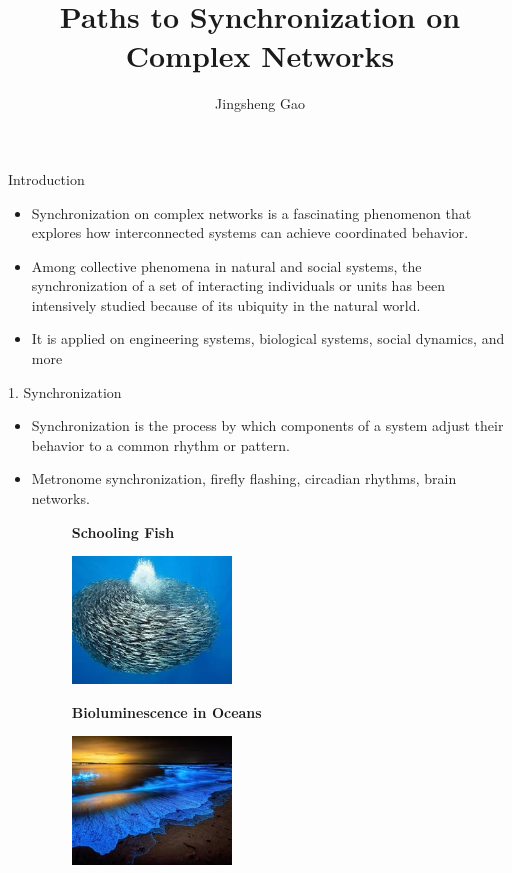 \documentclass[
  notheorems,
  aspectratio=54,
]{beamer}
\title{Paths to Synchronization on Complex Networks}
\author{Jingsheng Gao}
\institute{Anqing Normal University}
\begin{document}
\begin{frame}
    \titlepage
\end{frame}

\begin{frame}{Introduction}
 \begin{itemize}
    \item Synchronization on complex networks is a fascinating phenomenon that explores how interconnected systems can achieve coordinated behavior.
    \item Among collective phenomena in natural and social systems, the synchronization of a set of interacting individuals or units has been intensively studied because of its ubiquity in the natural world.
    \item It is applied on engineering systems, biological systems, social dynamics, and more
  \end{itemize}
\end{frame}

\begin{frame}{1. Synchronization}
  \begin{figure}
    \centering
  \end{figure}
  \begin{itemize}
    \item Synchronization is the process by which components of a system adjust their behavior to a common rhythm or pattern.
    \item Metronome synchronization, firefly flashing, circadian rhythms, brain networks.
\begin{figure}
  \begin{minipage}[b]{0.45\textwidth}
    \textbf{Schooling Fish}\par\medskip
    \includegraphics[width=0.4\textwidth]{schooling_fish.png}
  \end{minipage}
  \hfill
  \begin{minipage}[b]{0.45\textwidth}
    \textbf{Bioluminescence in Oceans}\par\medskip
    \includegraphics[width=0.4\textwidth]{bioluminescence.png}
  \end{minipage}
\end{figure}
  \end{itemize}
\end{frame}
\end{document}
